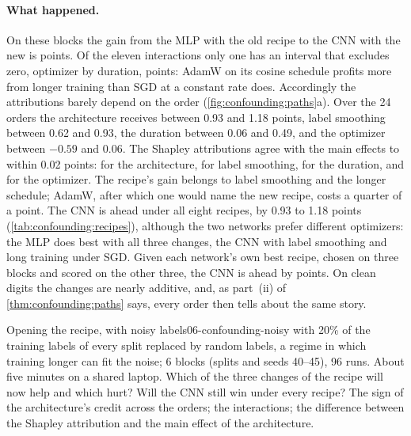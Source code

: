 \begin{refsection}
\paragraph{What happened.} On these blocks the gain from the MLP with the old recipe to the CNN with the new is  points. Of the eleven interactions only one has an interval that excludes zero, optimizer by duration,  points: AdamW on its cosine schedule profits more from longer training than SGD at a constant rate does. Accordingly the attributions barely depend on the order (\cref{fig:confounding:paths}a). Over the 24 orders the architecture receives between 0.93 and 1.18 points, label smoothing between 0.62 and 0.93, the duration between 0.06 and 0.49, and the optimizer between $-0.59$ and $0.06$. The Shapley attributions agree with the main effects to within 0.02 points:  for the architecture,  for label smoothing,  for the duration, and  for the optimizer. The recipe's gain belongs to label smoothing and the longer schedule; AdamW, after which one would name the new recipe, costs a quarter of a point. The CNN is ahead under all eight recipes, by 0.93 to 1.18 points (\cref{tab:confounding:recipes}), although the two networks prefer different optimizers: the MLP does best with all three changes, the CNN with label smoothing and long training under SGD. Given each network's own best recipe, chosen on three blocks and scored on the other three, the CNN is ahead by  points. On clean digits the changes are nearly additive, and, as part~(ii) of \cref{thm:confounding:paths} says, every order then tells about the same story.

\begin{lab}{Opening the recipe, with noisy labels}{06-confounding-noisy}\label{lab:confounding:noisy}
  with 20\% of the training labels of every split replaced by random labels, a regime in which training longer can fit the noise; 6 blocks (splits and seeds 40--45), 96 runs. About five minutes on a shared laptop.
 Which of the three changes of the recipe will now help and which hurt? Will the CNN still win under every recipe?
 The sign of the architecture's credit across the orders; the interactions; the difference between the Shapley attribution and the main effect of the architecture.
\end{lab}


\end{refsection}
